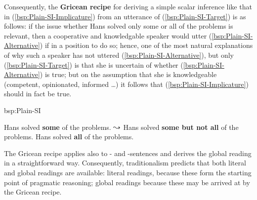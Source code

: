 \documentclass[fleqn,reqno,10pt,draft]{article}
\newcommand{\as}{\acro{as}}
\renewcommand{\es}{\acro{es}}
\renewcommand{\mymark}[1]{\textbf{#1}}
\begin{document}
Consequently, the \mymark{Gricean recipe}
\citep[see][]{Geurts2010:Quantity-Implic} for deriving a simple scalar
inference like that in (\ref{bsp:Plain-SI-Implicature}) from an
utterance of (\ref{bsp:Plain-SI-Target}) is as follows: if the issue
whether Hans solved only some or all of the problems is relevant, then
a cooperative and knowledgable speaker would utter
(\ref{bsp:Plain-SI-Alternative}) if in a position to do so; hence, one
of the most natural explanations of why such a speaker has not uttered
(\ref{bsp:Plain-SI-Alternative}), but only (\ref{bsp:Plain-SI-Target})
is that she is uncertain of whether (\ref{bsp:Plain-SI-Alternative})
is true; but on the assumption that she is knowledgeable (competent,
opinionated, informed \dots) it follows that
(\ref{bsp:Plain-SI-Implicature}) should in fact be true.

\begin{exer}{bsp:Plain-SI}
  \ex 
    \begin{xlist}
      \ex \label{bsp:Plain-SI-Target} Hans solved \mymark{some} of the problems.
      \ex \label{bsp:Plain-SI-Implicature} $\leadsto$ Hans solved
        \mymark{some but not all} of the problems.
      \ex  \label{bsp:Plain-SI-Alternative}  Hans solved \mymark{all} of the problems.
    \end{xlist}
\end{exer}

The Gricean recipe applies also to \as- and \es-sentences and derives
the global reading in a straightforward way. Consequently,
traditionalism predicts that both literal and global readings are
available: literal readings, because these form the starting point of
pragmatic reasoning; global readings because these may be arrived at
by the Gricean recipe. 
\end{document}

